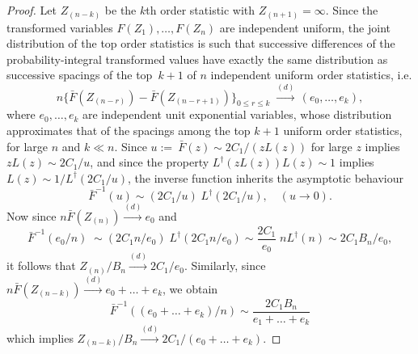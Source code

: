 \documentclass[10pt,a4paper]{amsart}
\begin{document}
\begin{proof}
	Let $Z_{(n-k)}$ be the $k$th order statistic with $Z_{(n+1)} = \infty$.
	Since the transformed variables $F(Z_1), \ldots, F(Z_n)$ are independent uniform, the joint distribution of the top order statistics is such that successive differences of the probability-integral transformed values have exactly the same distribution as successive spacings of the top~$k+1$ of $n$ independent uniform order statistics, i.e.
	\[
	n \{\bar F(Z_{(n-r)}) - \bar F(Z_{(n-r+1)}) \}_{0\le r \le k}
	\; \stackrel{(d)}{\to} \, (e_0, \ldots, e_k),
	\]
     where $e_0, \ldots, e_k$ are independent unit exponential variables, whose distribution approximates that of the spacings among the top $k+1$ uniform order statistics, for large $n$ and $k\ll n$. Since $u:=~\bar F(z) \sim  2C_1/(z L(z))$ for large $z$ implies $zL(z)\sim 2C_1/u$, and since the property $L^\dagger(z L (z))L(z) \sim 1$ implies $L(z)\sim 1/L^\dagger(2C_1/u)$, the inverse function inherits the asymptotic behaviour
	\[
	\bar{F}^{-1}(u)\sim (2C_1/u)\; L^\dagger(2C_1/u), \quad  (u \rightarrow 0).
	\] 
	Now since $n\bar{F}(Z_{(n)}) \stackrel{(d)}{\to} e_0$ and 
	\[
	\bar F^{-1}(e_0/n) \;\sim (2C_1n/e_0) \;  L^\dagger(2C_1n/e_0)  \sim \frac{2C_1}{e_0} \; n L^\dagger(n) \sim 2C_1 B_n/e_0,
	\]
	it follows that $Z_{(n)}/B_n \stackrel{(d)}{\to}2C_1/e_0$. 
	Similarly, since $n\bar{F}(Z_{(n-k)}) \stackrel{(d)}{\to} e_0+\dots+e_k$, we obtain
	\begin{equation}\label{e_rep}
	\bar{F}^{-1}((e_0+\dots+e_k)/n) \sim \frac{2C_1 B_n}{e_1+\dots+e_k}
	\end{equation}
	which implies $Z_{(n-k)}/B_n \stackrel{(d)}{\to} 2C_1/(e_0+\dots+e_k)$. 
	

\end{proof}
\end{document}
